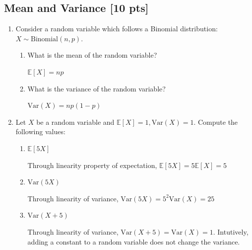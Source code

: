 \documentclass[a4paper]{article}
\theoremstyle{definition}
\newcommand{\Var}{\mathrm{Var}}
\newenvironment{soln}{
	\leavevmode\color{blue}\ignorespaces
}{}
\begin{document}
	\subsection{Mean and Variance [10 pts]}
	\begin{enumerate}
		\item Consider a random variable which follows a Binomial
		distribution: $X \sim \text{Binomial}(n, p)$.
		\begin{enumerate}
			\item What is the mean of the random variable?\\
			\begin{soln}
				$\mathbb{E}[X] = np$
			\end{soln}
			\item What is the variance of the random variable?\\
			\begin{soln}
				$\Var(X) = np(1-p)$
			\end{soln}
		\end{enumerate}
		
		\item Let $X$ be a random variable and
		$\mathbb{E}[X] = 1, \Var(X) = 1$. Compute the following values:
		\begin{enumerate}
			\item $\mathbb{E}[5X]$\\
			\begin{soln}
				Through linearity property of expectation, $\mathbb{E}[5X] = 5\mathbb{E}[X] = 5$
			\end{soln}
			\item $\Var(5X)$\\
			\begin{soln} 
			Through linearity of variance, $\Var(5X) = 5^2\Var(X) = 25$
			\end{soln}
			\item $\Var(X+5)$\\
			\begin{soln}
				Through linearity of variance, $\Var(X+5) = \Var(X) = 1$. Intutively, adding a constant to a random variable does not change the variance.
			\end{soln}
		\end{enumerate}
	\end{enumerate}
	
	
\end{document}
